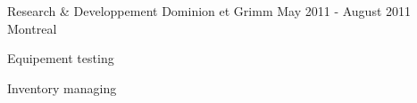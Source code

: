 \begin{cventries}
  \cventry
  {Research \& Developpement} %
  {Dominion et Grimm} %
    {May 2011 - August 2011} %
    {Montreal} %
    {
      \begin{cvitems} %
        \item {Equipement testing}
        \item {Inventory managing}
      \end{cvitems}
    }

\end{cventries}
